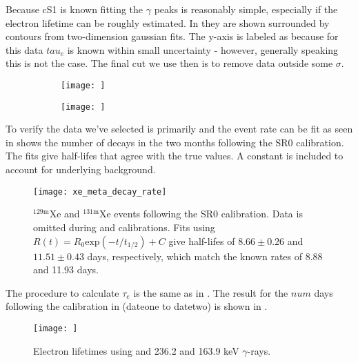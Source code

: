Because cS1 is known fitting the $\gamma$ peaks is reasonably simple, especially if the electron lifetime can be roughly estimated.  In
 they are shown surrounded by contours from two-dimension gaussian fits.  The
y-axis is labeled as \cstwob because for this data $tau_e$ is known within small uncertainty - however, generally speaking this is not
the case.  The final cut we use then is to remove data outside some $\sigma$.

\begin{figure}
    \begin{subfigure}[t]{0.4\textwidth}
        \texttt{[image: ]}
    \end{subfigure}%
    \begin{subfigure}[t]{0.65\textwidth}
        \texttt{[image: ]}
    \end{subfigure}
    \caption{}
	\label{fig:electron_lifetimes_measurement_gammas_s1_s2}
\end{figure}

To verify the data we've selected is primarily  and  the event rate can be fit as seen in
 shows the number of decays in the two months following the
SR0 \ambe calibration.  The fits give half-lifes that agree with the true values.  A constant is included to account for underlying
background.

\begin{figure}
\centering
\texttt{[image: xe\_meta\_decay\_rate]}
\caption{$\mathrm{^{129m}Xe}$ and $\mathrm{^{131m}Xe}$ events following the SR0 \ambe calibration.  Data is omitted during \metakr
and  calibrations.  Fits using $R(t) = R_0 \mathrm{exp}(-t/t_{1/2}) + C$ give half-lifes of $8.66 \pm 0.26$ and
$11.51 \pm 0.43$ days, respectively, which match the known rates of 8.88 and 11.93 days.}
\label{fig:electron_lifetimes_measurement_gammas_decay_rate}
\end{figure}

The procedure to calculate $\tau_e$ is the same as in .  The result for the
$num$ days following the \ambe calibration in  (dateone to datetwo)
is shown in .

\begin{figure}
\centering
\texttt{[image: ]}
\caption{Electron lifetimes using  and  236.2 and 163.9 keV $\gamma$-rays.}
\label{fig:electron_lifetimes_measurement_gammas_elifetime}
\end{figure}

